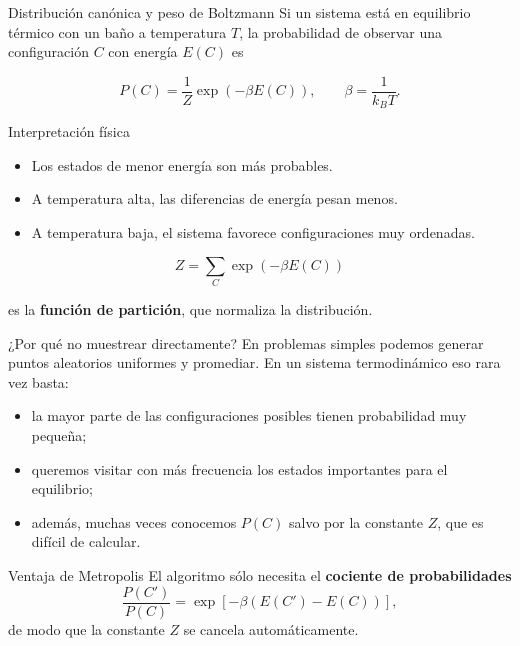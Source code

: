 \begin{frame}{Distribución canónica y peso de Boltzmann}
\justifying
Si un sistema está en equilibrio térmico con un baño a temperatura $T$, la
probabilidad de observar una configuración $C$ con energía $E(C)$ es

\begin{equation*}
P(C) = \frac{1}{Z}\exp(-\beta E(C)), \qquad \beta = \frac{1}{k_B T}.
\end{equation*}

\begin{block}{Interpretación física}
\begin{itemize}
    \item Los estados de menor energía son más probables.
    \item A temperatura alta, las diferencias de energía pesan menos.
    \item A temperatura baja, el sistema favorece configuraciones muy ordenadas.
\end{itemize}
\end{block}

\begin{equation*}
Z = \sum_C \exp(-\beta E(C))
\end{equation*}

es la \textbf{función de partición}, que normaliza la distribución.
\end{frame}

\begin{frame}{¿Por qué no muestrear directamente?}
\justifying
En problemas simples podemos generar puntos aleatorios uniformes y promediar.
En un sistema termodinámico eso rara vez basta:

\begin{itemize}
    \item la mayor parte de las configuraciones posibles tienen probabilidad muy pequeña;
    \item queremos visitar con más frecuencia los estados importantes para el equilibrio;
    \item además, muchas veces conocemos $P(C)$ salvo por la constante $Z$, que es difícil de calcular.
\end{itemize}

\begin{block}{Ventaja de Metropolis}
El algoritmo sólo necesita el \textbf{cociente de probabilidades}
\[
\frac{P(C')}{P(C)} = \exp[-\beta(E(C')-E(C))],
\]
de modo que la constante $Z$ se cancela automáticamente.
\end{block}
\end{frame}

